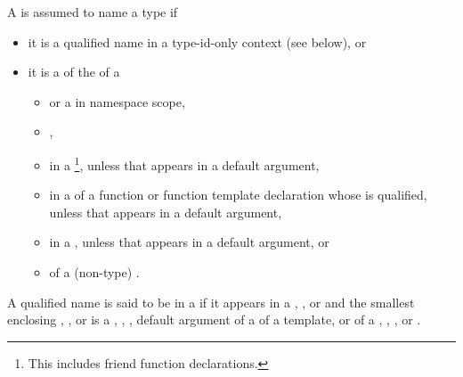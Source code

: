 \pnum
A 
is assumed to name a type if
\begin{itemize}
\item it is a qualified name in a type-id-only context (see below), or
\item it is a  of the  of a
\begin{itemize}
\item {} or a  in namespace scope,
\item {},
\item {} in a %
\footnote{This includes friend function declarations.},
unless that  appears in a default argument,
\item {} in a 
of a function or function template declaration
whose  is qualified,
unless that 
appears in a default argument,
\item {} in a ,
unless that  appears in a default argument, or
\item {} of a (non-type) .
\end{itemize}
\end{itemize}
A qualified name is said to be in a 
if it appears in a
,
, or
and the smallest enclosing
,
, or
is a
,
,
,
default argument of a  of a template, or
 of a
,
,
, or
.
